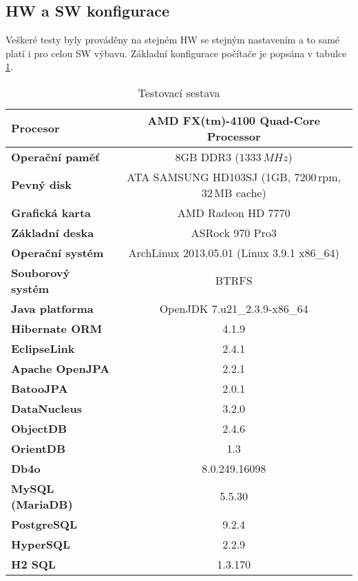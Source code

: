 \subsection{HW a SW konfigurace}
Veškeré testy byly prováděny na stejném HW se stejným nastavením a to samé platí i pro celou SW výbavu. Základní konfigurace počítače je popsána v tabulce \ref{hw}.
\begin{table}[!h]
\begin{center}
  \begin{tabular}{|l|c|}
    \hline
    \textbf{Procesor} & AMD FX(tm)-4100 Quad-Core Processor\\
    \hline
    \textbf{Operační paměť} & 8GB DDR3 ($1333\,MHz$)\\
    \hline
    \textbf{Pevný disk} & ATA SAMSUNG HD103SJ (1GB, 7200\,rpm, 32\,MB cache)\\
    \hline
    \textbf{Grafická karta} & AMD Radeon HD 7770\\
    \hline
    \textbf{Základní deska} & ASRock 970 Pro3\\
    \hline
    \textbf{Operační systém} & ArchLinux 2013.05.01 (Linux 3.9.1 x86\_64)\\
    \hline
    \textbf{Souborový systém} & BTRFS\\
    \hline
    \textbf{Java platforma} & OpenJDK 7.u21\_2.3.9-x86\_64\\
    \hline
    \textbf{Hibernate ORM} & 4.1.9\\
    \hline
    \textbf{EclipseLink} & 2.4.1\\
    \hline
    \textbf{Apache OpenJPA} & 2.2.1\\
    \hline
    \textbf{BatooJPA} & 2.0.1\\
    \hline
    \textbf{DataNucleus} & 3.2.0\\
    \hline
    \textbf{ObjectDB} & 2.4.6\\
    \hline
    \textbf{OrientDB} & 1.3\\
    \hline
    \textbf{Db4o} & 8.0.249.16098\\
    \hline
    \textbf{MySQL (MariaDB)} & 5.5.30\\
    \hline
    \textbf{PostgreSQL} & 9.2.4\\
    \hline
    \textbf{HyperSQL} & 2.2.9\\
    \hline
    \textbf{H2 SQL} & 1.3.170\\
    \hline
  \end{tabular}
\end{center}
  \caption{Testovací sestava}\label{hw}
\end{table}
